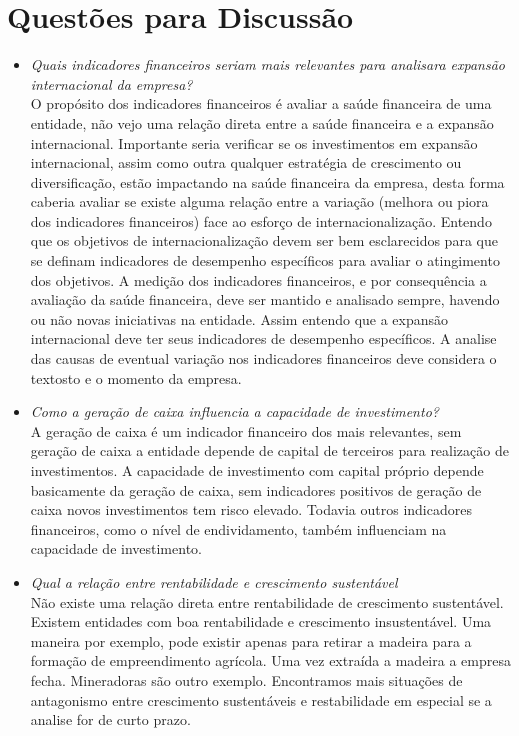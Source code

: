 \section{Questões para Discussão}
\begin{itemize}
\item \textit{Quais indicadores financeiros seriam mais relevantes para analisara expansão internacional da empresa?}\\
O propósito dos indicadores financeiros é avaliar a saúde financeira de uma entidade, não vejo uma relação direta entre a saúde financeira e a expansão internacional. Importante seria verificar se os investimentos em expansão internacional, assim como outra qualquer estratégia de crescimento ou diversificação, estão impactando na saúde financeira da empresa, desta forma caberia avaliar se existe alguma relação entre a variação (melhora ou piora dos indicadores financeiros) face ao esforço de internacionalização. Entendo que os objetivos de internacionalização devem ser bem esclarecidos para que se definam indicadores de desempenho específicos para avaliar o atingimento dos objetivos. A medição dos indicadores financeiros, e por consequência a avaliação da saúde financeira, deve ser mantido e analisado sempre, havendo ou não novas iniciativas na entidade. Assim entendo que a expansão internacional deve ter seus indicadores de desempenho específicos. A analise das causas de eventual variação nos indicadores financeiros deve considera o textosto e o momento da empresa.
\item \textit{Como a geração de caixa influencia a capacidade de investimento?}\\
  A geração de caixa é um indicador financeiro dos mais relevantes, sem geração de caixa a entidade depende de capital de terceiros para realização de investimentos. A capacidade de investimento com capital próprio depende basicamente da geração de caixa, sem indicadores positivos de geração de caixa novos investimentos tem risco elevado. Todavia outros indicadores financeiros, como o nível de endividamento, também influenciam na capacidade de investimento.
\item \textit{Qual a relação entre rentabilidade e crescimento sustentável}\\
  Não existe uma relação direta entre rentabilidade de crescimento sustentável. Existem entidades com boa rentabilidade e crescimento insustentável. Uma maneira por exemplo, pode existir apenas para retirar a madeira para a formação de empreendimento agrícola. Uma vez extraída a madeira a empresa fecha. Mineradoras são outro exemplo. Encontramos mais situações de antagonismo entre crescimento sustentáveis e restabilidade em especial se a analise for de curto prazo. 
\end{itemize}
